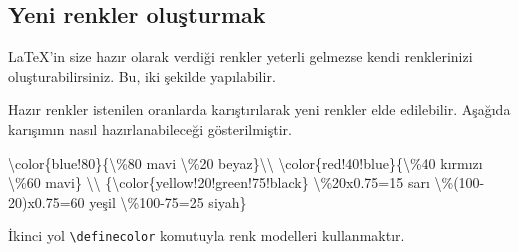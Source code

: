 \documentclass[
  letterpaper,
  DIV=11,
  numbers=noendperiod]{scrreprt}
\newenvironment{Shaded}{\begin{snugshade}}{\end{snugshade}}
\newcommand{\FunctionTok}[1]{\textcolor[rgb]{0.28,0.35,0.67}{#1}}
\newcommand{\NormalTok}[1]{\textcolor[rgb]{0.00,0.23,0.31}{#1}}
\begin{document}
\hypertarget{yeni-renkler-oluux15fturmak}{%
\subsection{Yeni renkler oluşturmak}\label{yeni-renkler-oluux15fturmak}}

{\LaTeX}'in size hazır olarak verdiği renkler yeterli gelmezse kendi
renklerinizi oluşturabilirsiniz. Bu, iki şekilde yapılabilir.

Hazır renkler istenilen oranlarda karıştırılarak yeni renkler elde
edilebilir. Aşağıda karışımın nasıl hazırlanabileceği gösterilmiştir.

\begin{Shaded}
\begin{Highlighting}[]
\FunctionTok{\textbackslash{}color}\NormalTok{\{blue!80\}\{}\FunctionTok{\textbackslash{}\%}\NormalTok{80 mavi }\FunctionTok{\textbackslash{}\%}\NormalTok{20 beyaz\}}\FunctionTok{\textbackslash{}\textbackslash{}}
\FunctionTok{\textbackslash{}color}\NormalTok{\{red!40!blue\}\{}\FunctionTok{\textbackslash{}\%}\NormalTok{40 kırmızı }\FunctionTok{\textbackslash{}\%}\NormalTok{60 mavi\} }\FunctionTok{\textbackslash{}\textbackslash{}}
\NormalTok{\{}\FunctionTok{\textbackslash{}color}\NormalTok{\{yellow!20!green!75!black\} }\FunctionTok{\textbackslash{}\%}\NormalTok{20x0.75=15 sarı}
\FunctionTok{\textbackslash{}\%}\NormalTok{(100{-}20)x0.75=60 yeşil }\FunctionTok{\textbackslash{}\%}\NormalTok{100{-}75=25 siyah\}}
\end{Highlighting}
\end{Shaded}

İkinci yol \texttt{\textbackslash{}definecolor} komutuyla renk modelleri
kullanmaktır.
\end{document}
